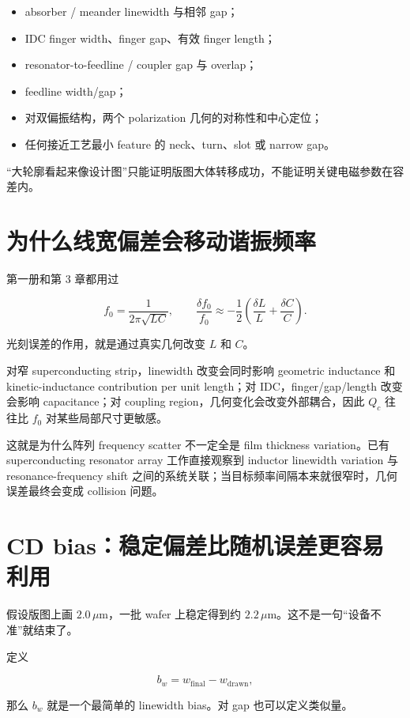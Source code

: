 \begin{itemize}
  \item absorber / meander linewidth 与相邻 gap；
  \item IDC finger width、finger gap、有效 finger length；
  \item resonator-to-feedline / coupler gap 与 overlap；
  \item feedline width/gap；
  \item 对双偏振结构，两个 polarization 几何的对称性和中心定位；
  \item 任何接近工艺最小 feature 的 neck、turn、slot 或 narrow gap。
\end{itemize}

“大轮廓看起来像设计图”只能证明版图大体转移成功，不能证明关键电磁参数在容差内。

\section{为什么线宽偏差会移动谐振频率}

第一册和第 3 章都用过

\[
f_0=\frac{1}{2\pi\sqrt{LC}},
\qquad
\frac{\delta f_0}{f_0}\approx
-\frac{1}{2}\left(\frac{\delta L}{L}+\frac{\delta C}{C}\right).
\]

光刻误差的作用，就是通过真实几何改变 $L$ 和 $C$。

对窄 superconducting strip，linewidth 改变会同时影响 geometric inductance 和 kinetic-inductance contribution per unit length；对 IDC，finger/gap/length 改变会影响 capacitance；对 coupling region，几何变化会改变外部耦合，因此 $Q_c$ 往往比 $f_0$ 对某些局部尺寸更敏感。

这就是为什么阵列 frequency scatter 不一定全是 film thickness variation。已有 superconducting resonator array 工作直接观察到 inductor linewidth variation 与 resonance-frequency shift 之间的系统关联；当目标频率间隔本来就很窄时，几何误差最终会变成 collision 问题。

\section{CD bias：稳定偏差比随机误差更容易利用}

假设版图上画 $2.0\,\mu\mathrm{m}$，一批 wafer 上稳定得到约 $2.2\,\mu\mathrm{m}$。这不是一句“设备不准”就结束了。

定义

\[
b_w=w_{\mathrm{final}}-w_{\mathrm{drawn}},
\]

那么 $b_w$ 就是一个最简单的 linewidth bias。对 gap 也可以定义类似量。

